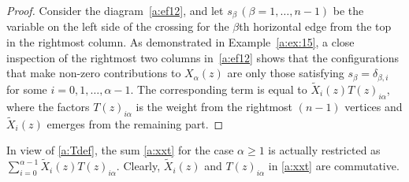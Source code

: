 \begin{proof}
Consider the diagram~\eqref{a:ef12}, and let $s_\beta\, (\beta=1,\ldots, n-1)$ be the variable on the left side of the crossing for the $\beta$th horizontal edge from the top in the rightmost column.
As demonstrated in Example~\ref{a:ex:15},  a close inspection of the rightmost two columns in~\eqref{a:ef12} shows that the configurations that make non-zero contributions to $X_\alpha(z)$ are only those satisfying $s_\beta = \delta_{\beta, i}$ for some $i=0,1,\ldots, \alpha-1$. 
The corresponding term is equal to $\widetilde{X}_i(z) T(z)_{i\alpha}$, where the factors $T(z)_{i\alpha}$ is the weight from the rightmost  $(n\!-\!1)$ vertices and $\widetilde{X}_i(z)$ emerges from the remaining part. 
 \end{proof}
 
 In view of \eqref{a:Tdef}, the sum \eqref{a:xxt} for the case $\alpha \ge 1$ is actually restricted as
 $\sum_{i=0}^{\alpha-1}\widetilde{X}_i(z) T(z)_{i\alpha}$.
Clearly, $\widetilde{X}_i(z)$ and $T(z)_{i\alpha}$ in \eqref{a:xxt} are commutative. 


